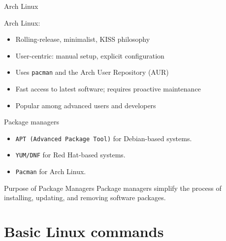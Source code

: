 \documentclass{beamer}
\begin{document}
\begin{frame}{Arch Linux}
  \begin{minipage}[t]{0.65\textwidth}
    Arch Linux:
    \begin{itemize}
      \item Rolling-release, minimalist, KISS philosophy
      \item User-centric: manual setup, explicit configuration
      \item Uses \texttt{pacman} and the Arch User Repository (AUR)
      \item Fast access to latest software; requires proactive maintenance
      \item Popular among advanced users and developers
    \end{itemize}
  \end{minipage}
  \hfill
  \begin{minipage}[t]{0.3\textwidth}
    \centering
  \end{minipage}
\end{frame}

\begin{frame}{Package managers}
  \begin{itemize}
    \item \texttt{APT (Advanced Package Tool)} for Debian-based systems.
    \item \texttt{YUM/DNF} for Red Hat-based systems.
    \item \texttt{Pacman} for Arch Linux.
  \end{itemize}
  \begin{block}{Purpose of Package Managers}
    Package managers simplify the process of installing, updating, and removing software packages.
  \end{block}
\end{frame}

\section{Basic Linux commands}
\end{document}
